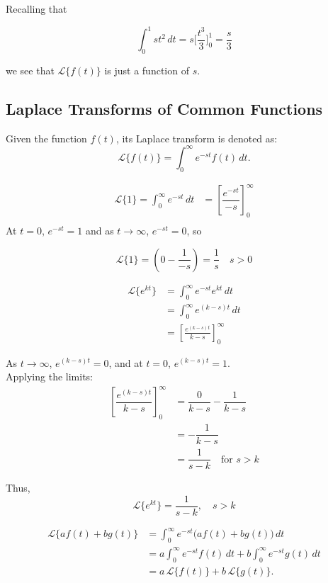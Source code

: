 \documentclass[a4paper]{article}
\theoremstyle{definition}
\theoremstyle{plain}
\begin{document}
\noindent Recalling that

$$\int_0^1 s t^2 \, dt = s\Big[\frac{t^3}{3}\Big]_0^1 = \frac{s}{3}$$
                     
\noindent we see that \( \mathcal{L}\{f(t)\} \) is just a function of \( s \).

\pagebreak
\subsection{Laplace Transforms of Common Functions}
Given the function \( f(t) \), its Laplace transform is denoted as: 
\[
\mathcal{L}\{f(t)\} = \int_0^\infty e^{-st} f(t) \, dt.
\]
\begin{notebox}
  \begin{align*}
    \mathcal{L}\{1\} = \int_{0}^{\infty} e^{-st} \, dt
    &= \left[\dfrac{e^{-st}}{-s}\right]_0^\infty \\
  \end{align*}
At \(t = 0\), \(e^{-st} = 1\) and as \(t \to \infty\), \(e^{-st} = 0\), so  

  \[
  \mathcal{L}\{1\} = \left(0 - \frac{1}{-s}\right) = \frac{1}{s} \quad s > 0
  \]

\end{notebox}

\begin{notebox}
  \begin{align*}
    \mathcal{L}\{e^{kt}\} 
    &= \int_{0}^{\infty} e^{-st} e^{kt} \, dt \\[6pt]
    &= \int_{0}^{\infty} e^{(k-s)t} \, dt \\[6pt]
    &= \left[\frac{e^{(k-s)t}}{k-s}\right]_{0}^{\infty} 
  \end{align*}
  
  As \(t \to \infty\), \(e^{(k-s)t} = 0\), and at \(t = 0\), \(e^{(k-s)t} = 1\).\\
  Applying the limits: 
  \begin{align*}
    \left[\dfrac{e^{(k-s)t}}{k-s}\right]_0^\infty 
    &= \dfrac{0}{k-s} - \dfrac{1}{k-s} \\[6pt]
    &= -\dfrac{1}{k-s} \\[6pt]
    &= \dfrac{1}{s-k} \quad \text{for } s > k
  \end{align*}
  
  Thus,
  \[
    \mathcal{L}\{e^{kt}\} = \dfrac{1}{s-k}, \quad s > k
  \]
\end{notebox}

\begin{notebox}
\begin{align*}
  \mathcal{L}\{a f(t) + b g(t)\} 
  &= \int_{0}^{\infty} e^{-st} \Big(a f(t) + b g(t)\Big) \, dt \\[6pt]
  &= a \int_{0}^{\infty} e^{-st} f(t) \, dt 
    + b \int_{0}^{\infty} e^{-st} g(t) \, dt \\[6pt]
  &= a\,\mathcal{L}\{f(t)\} + b\,\mathcal{L}\{g(t)\}.
  \end{align*}
\end{notebox} 
\newpage
\end{document}
